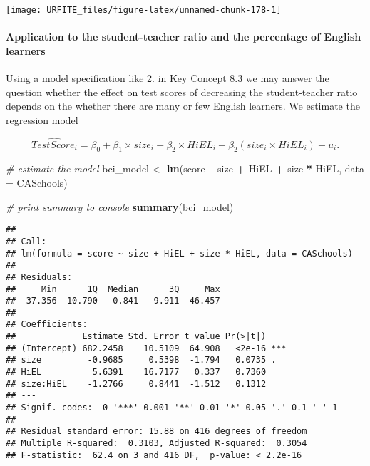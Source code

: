 \documentclass[]{book}
\newenvironment{Shaded}{\begin{snugshade}}{\end{snugshade}}
\newcommand{\KeywordTok}[1]{\textcolor[rgb]{0.13,0.29,0.53}{\textbf{#1}}}
\newcommand{\DataTypeTok}[1]{\textcolor[rgb]{0.13,0.29,0.53}{#1}}
\newcommand{\StringTok}[1]{\textcolor[rgb]{0.31,0.60,0.02}{#1}}
\newcommand{\CommentTok}[1]{\textcolor[rgb]{0.56,0.35,0.01}{\textit{#1}}}
\newcommand{\OperatorTok}[1]{\textcolor[rgb]{0.81,0.36,0.00}{\textbf{#1}}}
\newcommand{\NormalTok}[1]{#1}
\let\oldparagraph\paragraph
\renewcommand{\paragraph}[1]{\oldparagraph{#1}\mbox{}}
\theoremstyle{definition}
\theoremstyle{definition}
\theoremstyle{definition}
\theoremstyle{remark}
\begin{document}
\begin{center}\texttt{[image: URFITE\_files/figure-latex/unnamed-chunk-178-1]} \end{center}

\paragraph{Application to the student-teacher ratio and the percentage
of English
learners}\label{application-to-the-student-teacher-ratio-and-the-percentage-of-english-learners-1}

Using a model specification like 2. in Key Concept 8.3 we may answer the
question whether the effect on test scores of decreasing the
student-teacher ratio depends on the whether there are many or few
English learners. We estimate the regression model

\[ \widehat{TestScore_i} = \beta_0 + \beta_1 \times size_i + \beta_2 \times HiEL_i + \beta_2 (size_i \times HiEL_i) + u_i. \]

\begin{Shaded}
\begin{Highlighting}[]
\CommentTok{# estimate the model}
\NormalTok{bci_model <-}\StringTok{ }\KeywordTok{lm}\NormalTok{(score }\OperatorTok{~}\StringTok{ }\NormalTok{size }\OperatorTok{+}\StringTok{ }\NormalTok{HiEL }\OperatorTok{+}\StringTok{ }\NormalTok{size }\OperatorTok{*}\StringTok{ }\NormalTok{HiEL, }\DataTypeTok{data =}\NormalTok{ CASchools)}

\CommentTok{# print summary to console}
\KeywordTok{summary}\NormalTok{(bci_model)}
\end{Highlighting}
\end{Shaded}

\begin{verbatim}
## 
## Call:
## lm(formula = score ~ size + HiEL + size * HiEL, data = CASchools)
## 
## Residuals:
##     Min      1Q  Median      3Q     Max 
## -37.356 -10.790  -0.841   9.911  46.457 
## 
## Coefficients:
##             Estimate Std. Error t value Pr(>|t|)    
## (Intercept) 682.2458    10.5109  64.908   <2e-16 ***
## size         -0.9685     0.5398  -1.794   0.0735 .  
## HiEL          5.6391    16.7177   0.337   0.7360    
## size:HiEL    -1.2766     0.8441  -1.512   0.1312    
## ---
## Signif. codes:  0 '***' 0.001 '**' 0.01 '*' 0.05 '.' 0.1 ' ' 1
## 
## Residual standard error: 15.88 on 416 degrees of freedom
## Multiple R-squared:  0.3103, Adjusted R-squared:  0.3054 
## F-statistic:  62.4 on 3 and 416 DF,  p-value: < 2.2e-16
\end{verbatim}
\end{document}
